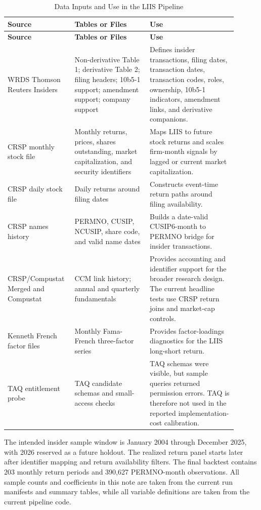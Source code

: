 \documentclass[11pt]{article}
\begin{document}
\begin{longtable}{L{0.23\linewidth}L{0.31\linewidth}L{0.36\linewidth}}
\caption{Data Inputs and Use in the LIIS Pipeline}\label{tab:data_inputs}\\
\toprule
\textbf{Source} & \textbf{Tables or Files} & \textbf{Use}\\
\midrule
\endfirsthead
\toprule
\textbf{Source} & \textbf{Tables or Files} & \textbf{Use}\\
\midrule
\endhead
WRDS Thomson Reuters Insiders &
Non-derivative Table 1; derivative Table 2; filing headers; 10b5-1 support;
amendment support; company support &
Defines insider transactions, filing dates, transaction dates, transaction
codes, roles, ownership, 10b5-1 indicators, amendment links, and derivative
companions.\\
\addlinespace
CRSP monthly stock file &
Monthly returns, prices, shares outstanding, market capitalization, and
security identifiers &
Maps LIIS to future stock returns and scales firm-month signals by lagged or
current market capitalization.\\
\addlinespace
CRSP daily stock file &
Daily returns around filing dates &
Constructs event-time return paths around filing availability.\\
\addlinespace
CRSP names history &
PERMNO, CUSIP, NCUSIP, share code, and valid name dates &
Builds a date-valid CUSIP6-month to PERMNO bridge for insider transactions.\\
\addlinespace
CRSP/Compustat Merged and Compustat &
CCM link history; annual and quarterly fundamentals &
Provides accounting and identifier support for the broader research design.
The current headline tests use CRSP return joins and market-cap controls.\\
\addlinespace
Kenneth French factor files &
Monthly Fama-French three-factor series &
Provides factor-loadings diagnostics for the LIIS long-short return.\\
\addlinespace
TAQ entitlement probe &
TAQ candidate schemas and small-access checks &
TAQ schemas were visible, but sample queries returned permission errors. TAQ is
therefore not used in the reported implementation-cost calibration.\\
\bottomrule
\end{longtable}

The intended insider sample window is January 2004 through December 2025, with
2026 reserved as a future holdout. The realized return panel starts later after
identifier mapping and return availability filters. The final backtest contains
203 monthly return periods and 390,627 PERMNO-month observations. All sample
counts and coefficients in this note are taken from the current run manifests
and summary tables, while all variable definitions are taken from the current
pipeline code.
\end{document}
